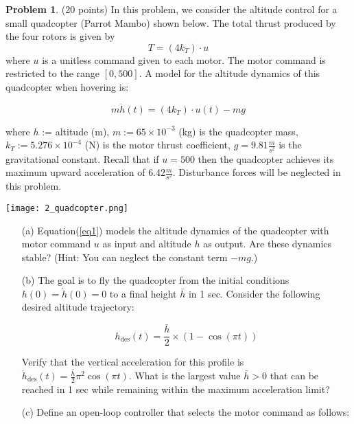 \documentclass{article}
\theoremstyle{definition}
\newtheorem{problem}{Problem}
\begin{document}
\begin{problem} (20 points)
In this problem, we consider the altitude control for a small quadcopter (Parrot Mambo) shown below. The total thrust produced by the four rotors is given by 
\[
T = (4k_T) \cdot u
\]
where \( u \) is a unitless command given to each motor. The motor command is restricted to the range \([0, 500]\). A model for the altitude dynamics of this quadcopter when hovering is:

\begin{equation}
\label{eq1}
    m\ddot{h}(t) = (4k_T) \cdot u(t) - mg
\end{equation}

where \( h \) := altitude (m), \( m := 65 \times 10^{-3} \) (kg) is the quadcopter mass, \( k_T := 5.276 \times 10^{-4} \) (N) is the motor thrust coefficient, \( g = 9.81 \frac{m}{s^2} \) is the gravitational constant. Recall that if \( u = 500 \) then the quadcopter achieves its maximum upward acceleration of \( 6.42 \frac{m}{s^2} \). Disturbance forces will be neglected in this problem.

\begin{center}
    \texttt{[image: 2\_quadcopter.png]}
\end{center}

\begin{enumerate}
\label{prob2}
    \item[(a)] Equation(\ref{eq1}) models the altitude dynamics of the quadcopter with motor command \( u \) as input and altitude \( h \) as output. Are these dynamics stable? (Hint: You can neglect the constant term \( -mg \).)
    
    \item[(b)] The goal is to fly the quadcopter from the initial conditions \( h(0) = \dot{h}(0) = 0 \) to a final height \( \bar{h} \) in 1 sec. Consider the following desired altitude trajectory:
    
    \begin{equation}
        h_{\text{des}}(t) = \frac{\bar{h}}{2} \times (1 - \cos(\pi t))
    \end{equation}
    
    Verify that the vertical acceleration for this profile is \( \ddot{h}_{\text{des}}(t) = \frac{\bar{h}}{2} \pi^2 \cos(\pi t) \). What is the largest value \( \bar{h} > 0 \) that can be reached in 1 sec while remaining within the maximum acceleration limit?
    
    \item[(c)] Define an open-loop controller that selects the motor command as follows:
    

\end{enumerate}
\end{problem}
\end{document}
